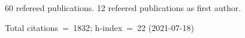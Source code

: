 60 refereed publications. 12 refeered publications as first author.

Total citations~=~1832; h-index~=~22 (2021-07-18)
